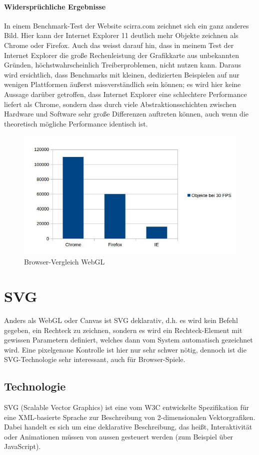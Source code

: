 \documentclass[a4paper, 12pt]{article}
\begin{document}
\paragraph{Widersprüchliche Ergebnisse} In einem Benchmark-Test der Website scirra.com zeichnet sich ein ganz anderes Bild. Hier kann der Internet Explorer 11 deutlich mehr Objekte zeichnen als Chrome oder Firefox. Auch das weisst darauf hin, dass in meinem Test der Internet Explorer die große Rechenleistung der Grafikkarte aus unbekannten Gründen, höchstwahrscheinlich Treiberproblemen, nicht nutzen kann. Daraus wird ersichtlich, dass Benchmarks mit kleinen, dedizierten Beispielen auf nur wenigen Plattformen äußerst missverständlich sein können; es wird hier keine Aussage darüber getroffen, dass Internet Explorer eine schlechtere Performance liefert als Chrome, sondern dass durch viele Abstraktionsschichten zwischen Hardware und Software sehr große Differenzen auftreten können, auch wenn die theoretisch mögliche Performance identisch ist.
\begin{figure}[H]
	\includegraphics[width=\textwidth]{assets/browser_comp_webgl} 
	\caption{Browser-Vergleich WebGL}
	\label{browser_comp_webgl}
\end{figure}
\newpage
\section{SVG}
Anders als WebGL oder Canvas ist SVG deklarativ, d.h. es wird kein Befehl gegeben, ein Rechteck zu zeichnen, sondern es wird ein Rechteck-Element mit gewissen Parametern definiert, welches dann vom System automatisch gezeichnet wird. Eine pixelgenaue Kontrolle ist hier nur sehr schwer nötig, dennoch ist die SVG-Technologie sehr interessant, auch für Browser-Spiele.
\subsection{Technologie}
SVG (Scalable Vector Graphics) ist eine vom W3C entwickelte Spezifikation für eine XML-basierte Sprache zur Beschreibung von 2-dimensionalen Vektorgrafiken. Dabei handelt es sich um eine deklarative Beschreibung, das heißt, Interaktivität oder Animationen müssen von aussen gesteuert werden (zum Beispiel über JavaScript).
\end{document}
